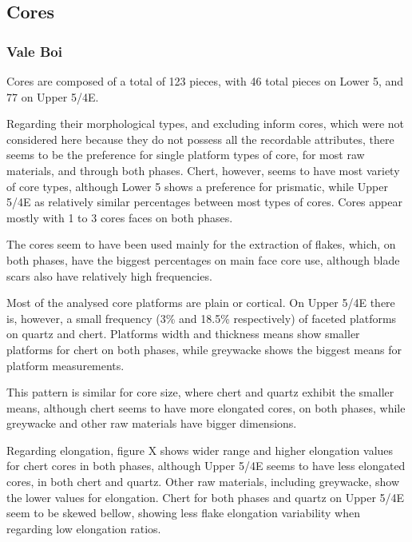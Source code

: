 \documentclass[12pt,twoside]{reedthesis}
\begin{document}
\hypertarget{cores}{%
\subsection{Cores}\label{cores}}

\hypertarget{vale-boi-4}{%
\subsubsection{Vale Boi}\label{vale-boi-4}}

Cores are composed of a total of 123 pieces, with 46 total pieces on Lower 5, and 77 on Upper 5/4E.

Regarding their morphological types, and excluding inform cores, which were not considered here because they do not possess all the recordable attributes, there seems to be the preference for single platform types of core, for most raw materials, and through both phases. Chert, however, seems to have most variety of core types, although Lower 5 shows a preference for prismatic, while Upper 5/4E as relatively similar percentages between most types of cores. Cores appear mostly with 1 to 3 cores faces on both phases.

The cores seem to have been used mainly for the extraction of flakes, which, on both phases, have the biggest percentages on main face core use, although blade scars also have relatively high frequencies.

Most of the analysed core platforms are plain or cortical. On Upper 5/4E there is, however, a small frequency (3\% and 18.5\% respectively) of faceted platforms on quartz and chert. Platforms width and thickness means show smaller platforms for chert on both phases, while greywacke shows the biggest means for platform measurements.

This pattern is similar for core size, where chert and quartz exhibit the smaller means, although chert seems to have more elongated cores, on both phases, while greywacke and other raw materials have bigger dimensions.

Regarding elongation, figure X shows wider range and higher elongation values for chert cores in both phases, although Upper 5/4E seems to have less elongated cores, in both chert and quartz. Other raw materials, including greywacke, show the lower values for elongation. Chert for both phases and quartz on Upper 5/4E seem to be skewed bellow, showing less flake elongation variability when regarding low elongation ratios.
\end{document}
